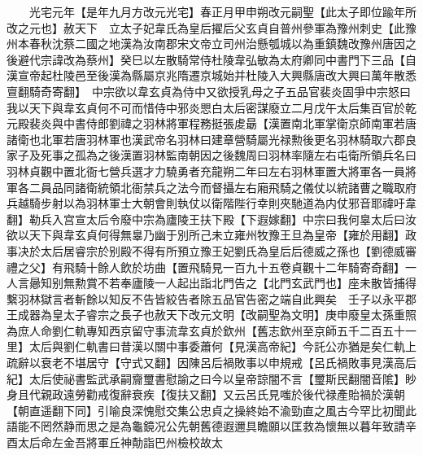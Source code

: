 　　光宅元年【是年九月方改元光宅】春正月甲申朔改元嗣聖【此太子即位踰年所改之元也】赦天下　立太子妃韋氏為皇后擢后父玄貞自普州參軍為豫州刺史【此豫州本春秋沈蔡二國之地漢為汝南郡宋文帝立司州治懸瓠城以為重鎮魏改豫州唐因之後避代宗諱改為蔡州】癸巳以左散騎常侍杜陵韋弘敏為太府卿同中書門下三品【自漢宣帝起杜陵邑至後漢為縣屬京兆隋遷京城始并杜陵入大興縣唐改大興曰萬年散悉亶翻騎奇寄翻】　中宗欲以韋玄貞為侍中又欲授乳母之子五品官裴炎固爭中宗怒曰我以天下與韋玄貞何不可而惜侍中邪炎愳白太后密謀廢立二月戊午太后集百官於乾元殿裴炎與中書侍郎劉禕之羽林將軍程務挺張䖍朂【漢置南北軍掌衛京師南軍若唐諸衛也北軍若唐羽林軍也漢武帝名羽林曰建章營騎屬光禄勲後更名羽林騎取六郡良家子及死事之孤為之後漢置羽林監南朝因之後魏周曰羽林率隨左右屯衛所領兵名曰羽林貞觀中置北衙七營兵選才力驍勇者充龍朔二年曰左右羽林軍置大將軍各一員將軍各二員品同諸衛統領北衙禁兵之法今而督攝左右廂飛騎之儀仗以統諸曹之職取府兵越騎步射以為羽林軍士大朝會則執仗以衛階陛行幸則夾馳道為内仗邪音耶禕吁韋翻】勒兵入宫宣太后令廢中宗為廬陵王扶下殿【下遐嫁翻】中宗曰我何辠太后曰汝欲以天下與韋玄貞何得無辠乃幽于別所己未立雍州牧豫王旦為皇帝【雍於用翻】政事决於太后居睿宗於别殿不得有所預立豫王妃劉氏為皇后后德威之孫也【劉德威審禮之父】有飛騎十餘人飲於坊曲【置飛騎見一百九十五卷貞觀十二年騎寄奇翻】一人言曏知别無勲賞不若奉廬陵一人起出詣北門告之【北門玄武門也】座未散皆捕得繫羽林獄言者斬餘以知反不告皆絞告者除五品官告密之端自此興矣　壬子以永平郡王成器為皇太子睿宗之長子也赦天下改元文明【改嗣聖為文明】庚申廢皇太孫重照為庶人命劉仁軌專知西京留守事流韋玄貞於欽州【舊志欽州至京師五千二百五十一里】太后與劉仁軌書曰昔漢以關中事委蕭何【見漢高帝紀】今託公亦猶是矣仁軌上疏辭以衰老不堪居守【守式又翻】因陳呂后禍敗事以申規戒【呂氏禍敗事見漢高后紀】太后使祕書監武承嗣齎璽書慰諭之曰今以皇帝諒闇不言【璽斯民翻闇音隂】眇身且代親政遠勞勸戒復辭衰疾【復扶又翻】又云呂氏見嗤於後代禄產貽禍於漢朝【朝直遥翻下同】引喻良深愧慰交集公忠貞之操終始不渝勁直之風古今罕比初聞此語能不罔然静而思之是為龜鏡况公先朝舊德遐邇具瞻願以匡救為懷無以暮年致請辛酉太后命左金吾將軍丘神勣詣巴州檢校故太

